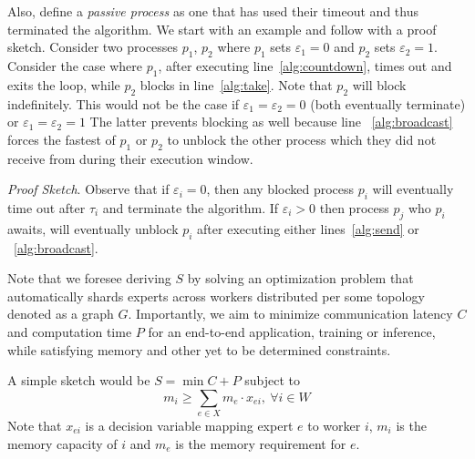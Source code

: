 Also, define a \emph{passive process} as one that has used their timeout and thus terminated the algorithm.
We start with an example and follow with a proof sketch.
Consider two processes $p_1$, $p_2$ where $p_1$ sets $\varepsilon_1=0$ and $p_2$ sets $\varepsilon_2=1$.
Consider the case where $p_1$, after executing line~\ref{alg:countdown},
times out and exits the loop, while $p_2$ blocks in line~\ref{alg:take}.
Note that $p_2$ will block indefinitely.
This would not be the case if $\varepsilon_1=\varepsilon_2=0$
(both eventually terminate) or $\varepsilon_1=\varepsilon_2=1$
The latter prevents blocking as well
because line ~\ref{alg:broadcast} forces the fastest of $p_1$ or $p_2$ to unblock the other process
which they did not receive from during their execution window.

\noindent\emph{Proof Sketch}.
Observe that if $\varepsilon_i =0$,
then any blocked process $p_i$ will eventually time out after $\tau_i$ and terminate the algorithm.
If $\varepsilon_i > 0$ then process $p_j$ who $p_i$ awaits, will eventually unblock $p_i$ after executing
either lines~\ref{alg:send} or ~\ref{alg:broadcast}.

Note that we foresee deriving $S$ by solving an optimization problem that automatically shards experts across
workers distributed per some topology denoted as a graph $G$.
Importantly, we aim to minimize communication latency $C$ and computation time $P$ for an end-to-end application,
training or inference, while satisfying memory and other yet to be determined constraints.

A simple sketch would be $ S = \min C + P$ subject to \[m_i \geq \sum_{e \in X} m_e \cdot x_{ei}, \> \forall i\in W\]
Note that $x_{ei}$ is a decision variable mapping expert $e$ to worker $i$, $m_i$ is the memory capacity of $i$ and
$m_e$ is the memory requirement for $e$.